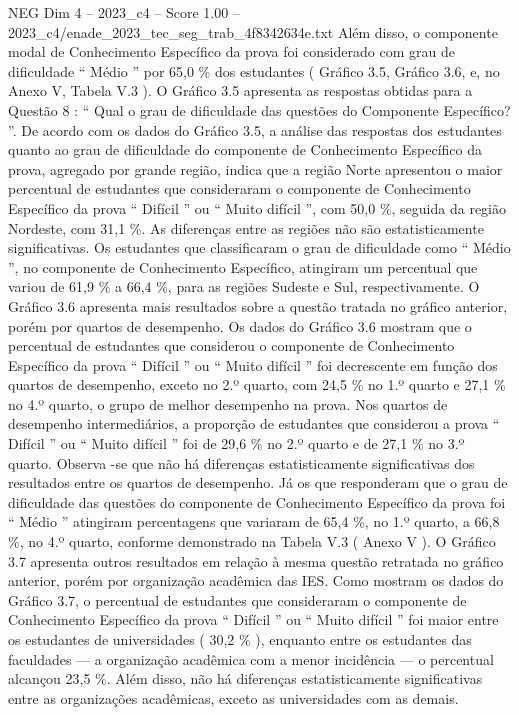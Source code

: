 \begin{textsample}{NEG Dim 4 – 2023\_c4 – Score 1.00 – 2023\_c4/enade\_2023\_tec\_seg\_trab\_4f8342634e.txt}
Além disso, o componente modal de Conhecimento Específico da prova foi considerado com grau de dificuldade “ Médio ” por 65,0 \% dos estudantes ( Gráfico 3.5, Gráfico 3.6, e, no Anexo V, Tabela V.3 ).
O Gráfico 3.5 apresenta as respostas obtidas para a Questão 8 : “ Qual o grau de dificuldade das questões do Componente Específico? ”.
De acordo com os dados do Gráfico 3.5, a análise das respostas dos estudantes quanto ao grau de dificuldade do componente de Conhecimento Específico da prova, agregado por grande região, indica que a região Norte apresentou o maior percentual de estudantes que consideraram o componente de Conhecimento Específico da prova “ Difícil ” ou “ Muito difícil ”, com 50,0 \%, seguida da região Nordeste, com 31,1 \%.
As diferenças entre as regiões não são estatisticamente significativas.
Os estudantes que classificaram o grau de dificuldade como “ Médio ”, no componente de Conhecimento Específico, atingiram um percentual que variou de 61,9 \% a 66,4 \%, para as regiões Sudeste e Sul, respectivamente.
O Gráfico 3.6 apresenta mais resultados sobre a questão tratada no gráfico anterior, porém por quartos de desempenho.
Os dados do Gráfico 3.6 mostram que o percentual de estudantes que considerou o componente de Conhecimento Específico da prova “ Difícil ” ou “ Muito difícil ” foi decrescente em função dos quartos de desempenho, exceto no 2.º quarto, com 24,5 \% no 1.º quarto e 27,1 \% no 4.º quarto, o grupo de melhor desempenho na prova.
Nos quartos de desempenho intermediários, a proporção de estudantes que considerou a prova “ Difícil ” ou “ Muito difícil ” foi de 29,6 \% no 2.º quarto e de 27,1 \% no 3.º quarto.
Observa -se que não há diferenças estatisticamente significativas dos resultados entre os quartos de desempenho.
Já os que responderam que o grau de dificuldade das questões do componente de Conhecimento Específico da prova foi “ Médio ” atingiram percentagens que variaram de 65,4 \%, no 1.º quarto, a 66,8 \%, no 4.º quarto, conforme demonstrado na Tabela V.3 ( Anexo V ).
O Gráfico 3.7 apresenta outros resultados em relação à mesma questão retratada no gráfico anterior, porém por organização acadêmica das IES.
Como mostram os dados do Gráfico 3.7, o percentual de estudantes que consideraram o componente de Conhecimento Específico da prova “ Difícil ” ou “ Muito difícil ” foi maior entre os estudantes de universidades ( 30,2 \% ), enquanto entre os estudantes das faculdades — a organização acadêmica com a menor incidência — o percentual alcançou 23,5 \%.
Além disso, não há diferenças estatisticamente significativas entre as organizações acadêmicas, exceto as universidades com as demais.

\end{textsample}
